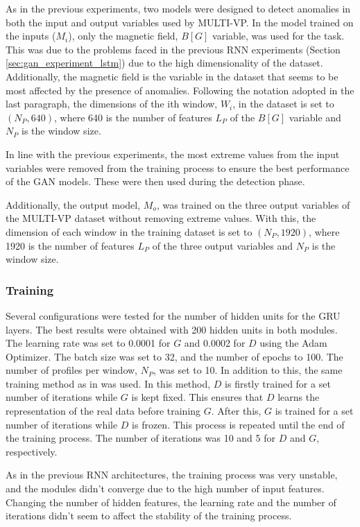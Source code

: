 As in the previous experiments, two models were designed to detect anomalies in both the input and output variables used by MULTI-VP. In the model trained on the inputs ($M_i$), only the magnetic field, $B [G]$ variable, was used for the task. This was due to the problems faced in the previous RNN experiments (Section \ref{sec:gan_experiment_lstm}) due to the high dimensionality of the dataset. Additionally, the magnetic field is the variable in the dataset that seems to be most affected by the presence of anomalies. Following the notation adopted in the last paragraph, the dimensions of the ith window, $W_{i}$, in the dataset is set to $(N_P, 640)$, where 640 is the number of features $L_P$ of the $B [G]$ variable and $N_P$ is the window size.

In line with the previous experiments, the most extreme values from the input variables were removed from the training process to ensure the best performance of the GAN models. These were then used during the detection phase.

Additionally, the output model, $M_o$, was trained on the three output variables of the MULTI-VP dataset without removing extreme values. With this, the dimension of each window in the training dataset is set to $(N_P, 1920)$, where 1920 is the number of features $L_P$ of the three output variables and $N_P$ is the window size.

\subsubsection*{Training}
Several configurations were tested for the number of hidden units for the GRU layers. The best results were obtained with 200 hidden units in both modules. The learning rate was set to 0.0001 for $G$ and 0.0002 for $D$ using the Adam Optimizer. The batch size was set to 32, and the number of epochs to 100. The number of profiles per window, $N_P$, was set to 10. In addition to this, the same training method as in \cite{li.etal_MADGANMultivariateAnomaly_2019} was used. In this method, $D$ is firstly trained for a set number of iterations while $G$ is kept fixed. This ensures that $D$ learns the representation of the real data before training $G$. After this, $G$ is trained for a set number of iterations while $D$ is frozen. This process is repeated until the end of the training process. The number of iterations was 10 and 5 for $D$ and $G$, respectively.

As in the previous RNN architectures, the training process was very unstable, and the modules didn't converge due to the high number of input features. Changing the number of hidden features, the learning rate and the number of iterations didn't seem to affect the stability of the training process.


